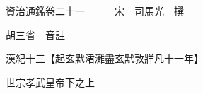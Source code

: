 










 


 
 


 

  
  
  
  
  





  
  
  
  
  
 
  

  

  
  
  



  

 
 

  
   




  

  
  


  　　資治通鑑卷二十一　　　宋　司馬光　撰

　　胡三省　音註

　　漢紀十三【起玄黓涒灘盡玄黓敦牂凡十一年】

　　世宗孝武皇帝下之上

